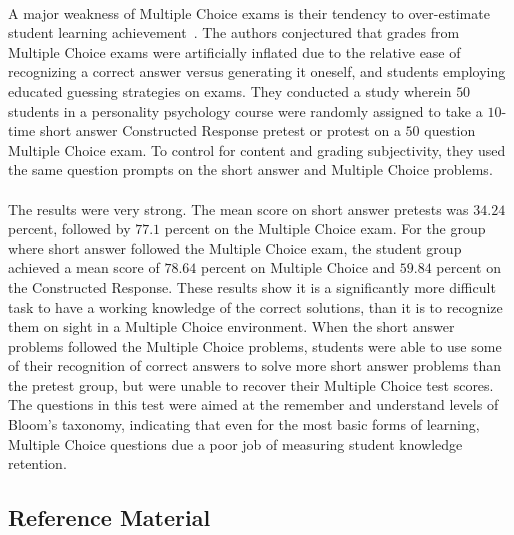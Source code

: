 \documentclass[12pt]{article}
\begin{document}
\paragraph{}
A major weakness of Multiple Choice exams is their tendency to over-estimate student learning achievement~\cite{funk2011multiple}. The authors conjectured that grades from Multiple Choice exams were artificially inflated due to the relative ease of recognizing a correct answer versus generating it oneself, and students employing educated guessing strategies on exams. They conducted a study wherein $50$ students in a personality psychology course were randomly assigned to take a $10$-time short answer Constructed Response pretest or protest on a $50$ question Multiple Choice exam. To control for content and grading subjectivity, they used the same question prompts on the short answer and Multiple Choice problems.
\paragraph{}
The results were very strong. The mean score on short answer pretests was $34.24$ percent, followed by $77.1$ percent on the Multiple Choice exam. For the group where short answer followed the Multiple Choice exam, the student group achieved a mean score of $78.64$ percent on Multiple Choice and $59.84$ percent on the Constructed Response. These results show it is a significantly more difficult task to have a working knowledge of the correct solutions, than it is to recognize them on sight in a Multiple Choice environment. When the short answer problems followed the Multiple Choice problems, students were able to use some of their recognition of correct answers to solve more short answer problems than the pretest group, but were unable to recover their Multiple Choice test scores. The questions in this test were aimed at the remember and understand levels of Bloom's taxonomy, indicating that even for the most basic forms of learning, Multiple Choice questions due a poor job of measuring student knowledge retention. 

\subsection{Reference Material}
\end{document}
